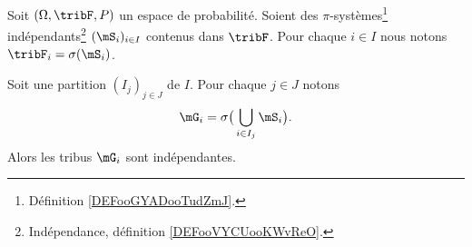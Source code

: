\begin{lemma}  \label{LemHOjqqw}
	Soit \( (\Omega,\tribF,P)\) un espace de probabilité. Soient des \( \pi\)-systèmes\footnote{Définition \ref{DEFooGYADooTudZmJ}.} indépendants\footnote{Indépendance, définition \ref{DEFooVYCUooKWvReO}.} \( (\mS_i)_{i\in I}\) contenus dans \( \tribF\). Pour chaque \( i\in I\) nous notons \( \tribF_i=\sigma(\mS_i)\).

	Soit une partition \( (I_j)_{j\in J}\) de \( I\). Pour chaque \( j\in J\) notons
	\begin{equation}		\label{EQooLMFGooDfRbim}
		\mG_i=\sigma\big( \bigcup_{i\in I_j}\mS_i \big).
	\end{equation}
	Alors les tribus \( \mG_i\) sont indépendantes.
\end{lemma}

